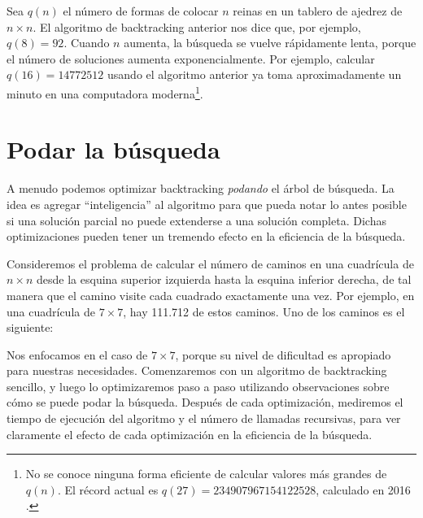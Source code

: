 Sea $q(n)$ el número de formas de
colocar $n$ reinas en un tablero de ajedrez de $n \times n$.
El algoritmo de backtracking anterior nos dice que, por ejemplo, $q(8)=92$.
Cuando $n$ aumenta, la búsqueda se vuelve rápidamente lenta,
porque el número de soluciones aumenta
exponencialmente.
Por ejemplo, calcular $q(16)=14772512$
usando el algoritmo anterior ya toma aproximadamente un minuto
en una computadora moderna\footnote{No se conoce ninguna forma eficiente de
  calcular valores más grandes de $q(n)$. El récord actual es
  $q(27)=234907967154122528$, calculado en 2016 \cite{q27}.}.

\newpage
\section{Podar la búsqueda}

A menudo podemos optimizar backtracking \emph{podando} el árbol de búsqueda.
La idea es agregar ``inteligencia'' al algoritmo
para que pueda notar lo antes posible
si una solución parcial no puede extenderse
a una solución completa.
Dichas optimizaciones pueden tener un tremendo
efecto en la eficiencia de la búsqueda.

Consideremos el problema
de calcular el número de caminos
en una cuadrícula de $n \times n$ desde la esquina superior izquierda
hasta la esquina inferior derecha, de tal manera que
el camino visite cada cuadrado exactamente una vez.
Por ejemplo, en una cuadrícula de $7 \times 7$,
hay 111.712 de estos caminos.
Uno de los caminos es el siguiente:

\begin{center}
\end{center}

Nos enfocamos en el caso de $7 \times 7$,
porque su nivel de dificultad es apropiado para nuestras necesidades.
Comenzaremos con un algoritmo de backtracking sencillo,
y luego lo optimizaremos paso a paso utilizando observaciones
sobre cómo se puede podar la búsqueda.
Después de cada optimización, mediremos el tiempo de ejecución
del algoritmo y el número de llamadas recursivas,
para ver claramente el efecto de cada
optimización en la eficiencia de la búsqueda.

